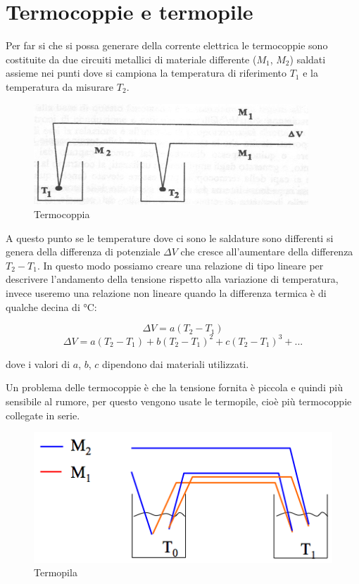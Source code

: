 \section{Termocoppie e termopile}
Per far si che si possa generare della corrente elettrica le
termocoppie sono costituite da due circuiti metallici di materiale
differente ($M_1$, $M_2$) saldati assieme nei punti dove si
campiona la temperatura di riferimento $T_1$ e la temperatura
da misurare $T_2$.

\begin{figure}[htbp]
	\centering
	\includegraphics[scale=0.5]
			{img/termocoppia.png}
	\caption{Termocoppia\label{fig:termocoppia}}
\end{figure}

A questo punto se le temperature dove ci sono le saldature sono
differenti si genera della differenza di potenziale $\Delta V$ che
cresce all'aumentare della differenza $T_2-T_1$.
In questo modo possiamo creare una relazione di tipo lineare per
descrivere l'andamento della tensione rispetto alla variazione di
temperatura, invece useremo una relazione non lineare quando la
differenza termica è di qualche decina di °C:

	\[\Delta V = a(T_2 -T_1)\]
	\[\Delta V = a(T_2-T_1)+b(T_2-T_1)^2+c(T_2-T_1)^3+ ...\]

dove i valori di $a$, $b$, $c$ dipendono dai materiali utilizzati.

Un problema delle termocoppie è che la tensione fornita è piccola e
quindi più sensibile al rumore, per questo vengono usate le termopile,
cioè più termocoppie collegate in serie.

\begin{figure}[htbp]
	\centering
	\includegraphics[scale=0.5]
			{img/termopila.png}
	\caption{Termopila\label{fig:termopila}}
\end{figure}

